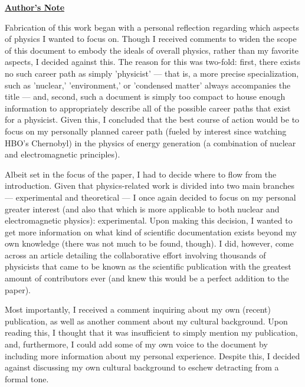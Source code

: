 



\begin{tcolorbox}
\begin{center}

  \textbf{\underline{Author's Note}}

\end{center}

\begin{justify}


  \vspace{-15pt}

  \hspace{.5in} Fabrication of this work began with a personal reflection regarding which aspects of physics I wanted to focus on. Though I received comments to widen the scope of this document to embody the ideals of overall physics, rather than my favorite aspects, I decided against this. The reason for this was two-fold: first, there exists no such career path as simply 'physicist' — that is, a more precise specialization, such as 'nuclear,' 'environment,' or 'condensed matter' always accompanies the title — and, second, such a document is simply too compact to house enough information to appropriately describe all of the possible career paths that exist for a physicist. Given this, I concluded that the best course of action would be to focus on my personally planned career path (fueled by interest since watching HBO's Chernobyl) in the physics of energy generation (a combination of nuclear and electromagnetic principles).
  
  \hspace{.5in} Albeit set in the focus of the paper, I had to decide where to flow from the introduction. Given that physics-related work is divided into two main branches — experimental and theoretical — I once again decided to focus on my personal greater interest (and also that which is more applicable to both nuclear and electromagnetic physics): experimental. Upon making this decision, I wanted to get more information on what kind of scientific documentation exists beyond my own knowledge (there was not much to be found, though). I did, however, come across an article detailing the collaborative effort involving thousands of physicists that came to be known as the scientific publication with the greatest amount of contributors ever (and knew this would be a perfect addition to the paper).

  \hspace{.5in} Most importantly, I received a comment inquiring about my own (recent) publication, as well as another comment about my cultural background. Upon reading this, I thought that it was insufficient to simply mention my publication, and, furthermore, I could add some of my own voice to the document by including more information about my personal experience. Despite this, I decided against discussing my own cultural background to eschew detracting from a formal tone.


\end{justify}
\end{tcolorbox}
